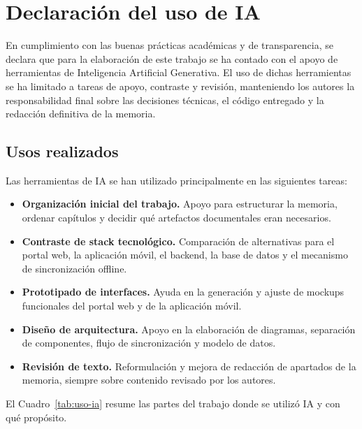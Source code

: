 \chapter{Declaración del uso de IA}

En cumplimiento con las buenas prácticas académicas y de transparencia, se declara
que para la elaboración de este trabajo se ha contado con el apoyo de herramientas
de Inteligencia Artificial Generativa. El uso de dichas herramientas se ha limitado
a tareas de apoyo, contraste y revisión, manteniendo los autores la responsabilidad
final sobre las decisiones técnicas, el código entregado y la redacción definitiva
de la memoria.

\section{Usos realizados}

Las herramientas de IA se han utilizado principalmente en las siguientes tareas:

\begin{itemize}[leftmargin=1.5em]
  \item \textbf{Organización inicial del trabajo.} Apoyo para estructurar la memoria,
    ordenar capítulos y decidir qué artefactos documentales eran necesarios.
  \item \textbf{Contraste de stack tecnológico.} Comparación de alternativas para el
    portal web, la aplicación móvil, el backend, la base de datos y el mecanismo de
    sincronización offline.
  \item \textbf{Prototipado de interfaces.} Ayuda en la generación y ajuste de
    mockups funcionales del portal web y de la aplicación móvil.
  \item \textbf{Diseño de arquitectura.} Apoyo en la elaboración de diagramas,
    separación de componentes, flujo de sincronización y modelo de datos.
  \item \textbf{Revisión de texto.} Reformulación y mejora de redacción de apartados
    de la memoria, siempre sobre contenido revisado por los autores.
\end{itemize}

El Cuadro~\ref{tab:uso-ia} resume las partes del trabajo donde se utilizó IA y con
qué propósito.

